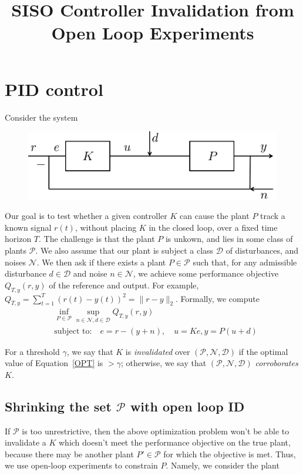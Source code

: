 \documentclass[11pt]{article} %
\title{SISO Controller Invalidation from Open Loop Experiments}
\newcommand{\calD}{\mathcal{D}}
\newcommand{\calN}{\mathcal{N}}
\newcommand{\calP}{\mathcal{P}}
\theoremstyle{plain}
\theoremstyle{definition}
\theoremstyle{remark}
\newcommand{\rd}[1]{{\color{red}{ #1}}}
\begin{document}
\section{PID control}
Consider the system
\begin{figure}[h!]
  \centering
  \includegraphics[width=.5\linewidth]{sys2.pdf}
\end{figure}
Our goal is to test whether a given controller $K$ can cause the plant $P$ track a known signal $r(t)$, without placing $K$ in the closed loop, over a fixed time horizon $T$. The challenge is that the plant $P$ is unkown, and lies in some class of plants $\calP$. We also assume that our plant is subject a class $\calD$ of disturbances, and noises $\calN$. We then ask if there exists a plant $P \in \calP$ such that, for any admissible disturbance $d \in \calD$ and noise $n \in \calN$, we achieve some performance objective $Q_{T,y}(r,y)$ of the reference and output. For example, $Q_{T,y} = \sum_{t=1}^T (r(t)-y(t))^{2} = \|r - y\|_{2}$. Formally, we compute
\begin{equation}\label{OPT}
\begin{aligned}
&\inf_{P \in \calP} \sup_{n \in \calN,d \in \calD} Q_{T,y}(r,y)  \\
&\text{subject to:} \quad e = r - (y+n), \quad u = Ke, y = P(u+d)
\end{aligned}
\end{equation}



For a threshold $\gamma$, we say that $K$ is \emph{invalidated} \rd{wouldn't this be more of a robust control setup? in the papers we have seen, wouldn't ``model invalidation'' be an inf inf, rather than an inf sup?} over $(\calP,\calN,\calD)$ if the optimal value of Equation~\ref{OPT} is $> \gamma$; otherwise, we say that $(\calP,\calN,\calD)$ \emph{corroborates} $K$. 
\subsection{Shrinking the set $\calP$ with open loop ID}
If $\calP$ is too unrestrictive, then the above optimization problem won't be able to invalidate a $K$ which doesn't meet the performance objective on the true plant, because there may be another plant $P' \in \calP$ for which the objective is met. Thus, we use open-loop experiments to constrain $P$. Namely, we consider the plant
\end{document}
